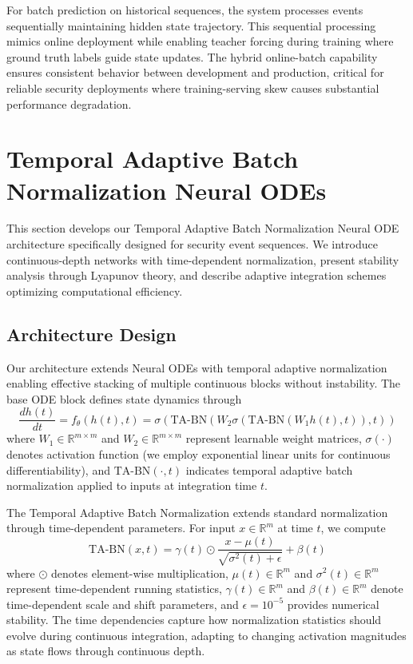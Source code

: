 \documentclass[10pt,journal,compsoc]{IEEEtran}
\newcommand{\R}{\mathbb{R}}
\begin{document}
For batch prediction on historical sequences, the system processes events sequentially maintaining hidden state trajectory. This sequential processing mimics online deployment while enabling teacher forcing during training where ground truth labels guide state updates. The hybrid online-batch capability ensures consistent behavior between development and production, critical for reliable security deployments where training-serving skew causes substantial performance degradation.

\section{Temporal Adaptive Batch Normalization Neural ODEs}
\label{sec:tabn_ode}

This section develops our Temporal Adaptive Batch Normalization Neural ODE architecture specifically designed for security event sequences. We introduce continuous-depth networks with time-dependent normalization, present stability analysis through Lyapunov theory, and describe adaptive integration schemes optimizing computational efficiency.

\subsection{Architecture Design}

Our architecture extends Neural ODEs with temporal adaptive normalization enabling effective stacking of multiple continuous blocks without instability. The base ODE block defines state dynamics through
\begin{equation}
\frac{dh(t)}{dt} = f_\theta(h(t), t) = \sigma\left(\text{TA-BN}(W_2 \sigma(\text{TA-BN}(W_1 h(t), t)), t)\right)
\label{eq:tabn_ode_block}
\end{equation}
where $W_1 \in \R^{m \times m}$ and $W_2 \in \R^{m \times m}$ represent learnable weight matrices, $\sigma(\cdot)$ denotes activation function (we employ exponential linear units for continuous differentiability), and $\text{TA-BN}(\cdot, t)$ indicates temporal adaptive batch normalization applied to inputs at integration time $t$.

The Temporal Adaptive Batch Normalization extends standard normalization through time-dependent parameters. For input $x \in \R^m$ at time $t$, we compute
\begin{equation}
\text{TA-BN}(x, t) = \gamma(t) \odot \frac{x - \mu(t)}{\sqrt{\sigma^2(t) + \epsilon}} + \beta(t)
\end{equation}
where $\odot$ denotes element-wise multiplication, $\mu(t) \in \R^m$ and $\sigma^2(t) \in \R^m$ represent time-dependent running statistics, $\gamma(t) \in \R^m$ and $\beta(t) \in \R^m$ denote time-dependent scale and shift parameters, and $\epsilon = 10^{-5}$ provides numerical stability. The time dependencies capture how normalization statistics should evolve during continuous integration, adapting to changing activation magnitudes as state flows through continuous depth.
\end{document}
